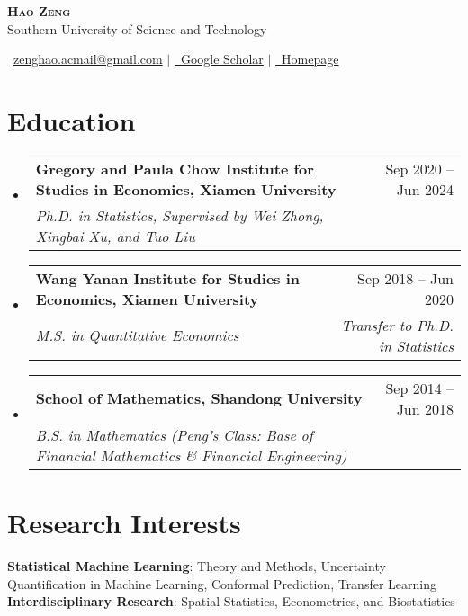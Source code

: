 \documentclass[letterpaper,10pt]{article}
\makeatletter
\newcommand{\resumeSubheading}[4]{
  \vspace{-2pt}\item
    \begin{tabular*}{0.97\textwidth}[t]{l@{\extracolsep{\fill}}r}
      \textbf{#1} & #2 \\
      \textit{\small#3} & \textit{\small #4} \\
    \end{tabular*}\vspace{-7pt}
}
\newcommand{\resumeSubHeadingListStart}{\begin{itemize}[leftmargin=0.15in, label={}]}
\newcommand{\resumeSubHeadingListEnd}{\end{itemize}}
\makeatother
\begin{document}
\begin{center}
    \textbf{\Huge \scshape Hao Zeng}
    \vspace{0.5em}\\
    {\small Southern University of Science and Technology}
\end{center}

\begin{center}
    \small \faEnvelope\ \href{mailto:zenghao.acmail@gmail.com}{zenghao.acmail@gmail.com} $|$
    \href{https://scholar.google.com/citations?user=-EiBHeIAAAAJ&hl=en}{\faGraduationCap\ Google Scholar} $|$
    \href{https://zenghao-stat.github.io}{\faHome\ Homepage}
\end{center}

\section{Education}
  \resumeSubHeadingListStart
    \resumeSubheading
      {Gregory and Paula Chow Institute for Studies in Economics, Xiamen University}{Sep 2020 -- Jun 2024}
      {Ph.D. in Statistics, Supervised by Wei Zhong, Xingbai Xu, and Tuo Liu}{}
    
    \resumeSubheading
      {Wang Yanan Institute for Studies in Economics, Xiamen University}{Sep 2018 -- Jun 2020}
      {M.S. in Quantitative Economics}{Transfer to Ph.D. in Statistics}
    
    \resumeSubheading
      {School of Mathematics, Shandong University}{Sep 2014 -- Jun 2018}
      {B.S. in Mathematics (Peng's Class: Base of Financial Mathematics \& Financial Engineering)}{}
  \resumeSubHeadingListEnd


\section{Research Interests}
 \begin{itemize}[leftmargin=0.15in, label={}]
    \small{\item{
     \textbf{Statistical Machine Learning}{: Theory and Methods, Uncertainty Quantification in Machine Learning, Conformal Prediction, Transfer Learning} \\
     \textbf{Interdisciplinary Research}{: Spatial Statistics, Econometrics, and Biostatistics}
    }}
 \end{itemize}
\end{document}
